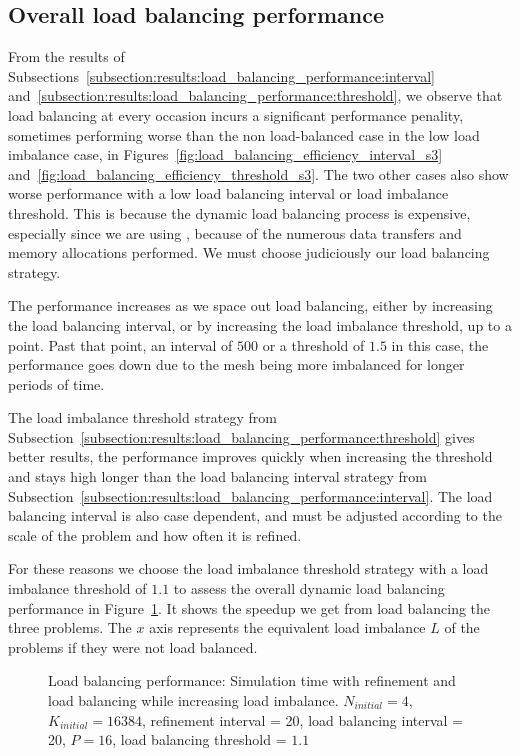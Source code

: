 \subsection{Overall load balancing performance}\label{subsection:results:load_balancing_performance:overall}

From the results of Subsections~\ref{subsection:results:load_balancing_performance:interval}
and~\ref{subsection:results:load_balancing_performance:threshold}, we observe that load balancing at
every occasion incurs a significant performance penality, sometimes performing worse than the non
load-balanced case in the low load imbalance case, in
Figures~\ref{fig:load_balancing_efficiency_interval_s3}
and~\ref{fig:load_balancing_efficiency_threshold_s3}. The two other cases also show worse
performance with a low load balancing interval or load imbalance threshold. This is because the
dynamic load balancing process is expensive, especially since we are using ,
because of the numerous data transfers and memory allocations performed. We must choose judiciously
our load balancing strategy. 

The performance increases as we space out load balancing, either by increasing the load balancing
interval, or by increasing the load imbalance threshold, up to a point. Past that point, an interval
of \(500\) or a threshold of \(1.5\) in this case, the performance goes down due to the mesh being
more imbalanced for longer periods of time.

The load imbalance threshold strategy from
Subsection~\ref{subsection:results:load_balancing_performance:threshold} gives better results, the
performance improves quickly when increasing the threshold and stays high longer than the load
balancing interval strategy from
Subsection~\ref{subsection:results:load_balancing_performance:interval}. The load balancing interval
is also case dependent, and must be adjusted according to the scale of the problem and how often it
is refined. 

For these reasons we choose the load imbalance threshold strategy with a load imbalance threshold of
\(1.1\) to assess the overall dynamic load balancing performance in
Figure~\ref{fig:load_balancing_efficiency}. It shows the speedup we get from load balancing the
three problems. The \(x\) axis represents the equivalent load imbalance \(L\) of the problems if
they were not load balanced.

\begin{figure}[H]
    \centering
    
    \caption{Load balancing performance: Simulation time with refinement and load balancing while increasing load imbalance. \(N_{initial} = 4\), \(K_{initial} = 16384\), refinement interval = 20, load balancing interval = 20, \(P = 16\), load balancing threshold = \(1.1\)}\label{fig:load_balancing_efficiency}
\end{figure}


